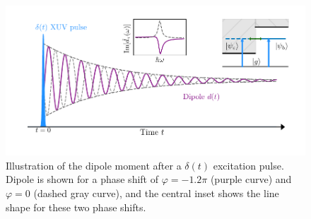 \begin{figure}
	\centering
	\includegraphics[width=1.0\textwidth]{figures/ATS/dipole_sketch.pdf}
	\caption{Illustration of the dipole moment after a $\delta(t)$ excitation pulse. Dipole is shown for a phase shift of $\varphi=-1.2\pi$ (purple curve) and $\varphi=0$ (dashed gray curve), and the central inset shows the line shape for these two phase shifts.}
	\label{fig:dipole_sketch}
\end{figure}

